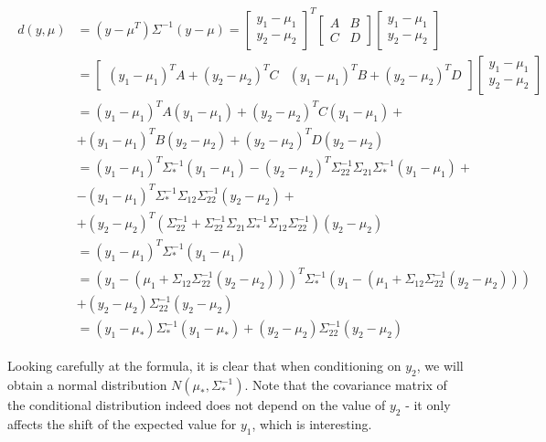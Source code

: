 \documentclass[fleqn]{article}
\numberwithin{equation}{section}
\numberwithin{theorem}{section}
\numberwithin{figure}{section}
\numberwithin{lemma}{section}
\numberwithin{corollary}{section}
\begin{document}
\begin{align}
	\begin{split}
		d(y, \mu) &= (y - \mu^T)\Sigma^{-1}(y-\mu) = \begin{bmatrix}
			y_1 - \mu_1  \\
			y_2 - \mu_2 
		\end{bmatrix}^T
		\begin{bmatrix}
			A & B \\
			C & D
		\end{bmatrix}
		\begin{bmatrix}
			y_1 - \mu_1  \\
			y_2 - \mu_2 
		\end{bmatrix} \\
		&= \begin{bmatrix}
			(y_1 - \mu_1)^TA + (y_2 - \mu_2)^TC & (y_1 - \mu_1)^TB + (y_2 - \mu_2)^TD 
		\end{bmatrix}
		\begin{bmatrix}
			y_1 - \mu_1  \\
			y_2 - \mu_2 
		\end{bmatrix} \\
		&= (y_1 - \mu_1)^TA(y_1 - \mu_1) + (y_2 - \mu_2)^TC(y_1 - \mu_1) +  \\
		&+ (y_1 - \mu_1)^TB(y_2 - \mu_2) + (y_2 - \mu_2)^TD(y_2 - \mu_2)\\
		&= (y_1 - \mu_1)^T\Sigma_*^{-1}(y_1 - \mu_1) -(y_2 - \mu_2)^T\Sigma_{22}^{-1}\Sigma_{21}\Sigma_*^{-1}(y_1 - \mu_1) +  \\
		&- (y_1 - \mu_1)^T\Sigma_*^{-1}\Sigma_{12}\Sigma_{22}^{-1}(y_2 - \mu_2) +\\
		&+ (y_2 - \mu_2)^T(\Sigma_{22}^{-1} + \Sigma_{22}^{-1} \Sigma_{21}\Sigma_*^{-1}\Sigma_{12}\Sigma_{22}^{-1})(y_2 - \mu_2)\\
		&= (y_1 - \mu_1)^T\Sigma_*^{-1}(y_1 - \mu_1)\\
		&= (y_1 - (\mu_1 + \Sigma_{12}\Sigma_{22}^{-1}(y_2 - \mu_2)))^T \Sigma_*^{-1} (y_1 - (\mu_1 + \Sigma_{12}\Sigma_{22}^{-1}(y_2 - \mu_2))) \\
		&+ (y_2 - \mu_2) \Sigma_{22}^{-1}(y_2 - \mu_2)\\
		&= (y_1 - \mu_*)\Sigma_*^{-1}(y_1 - \mu_*) +  (y_2 - \mu_2) \Sigma_{22}^{-1}(y_2 - \mu_2)
	\end{split}
\end{align}

Looking carefully at the formula, it is clear that when conditioning on $y_2$, we will obtain a normal distribution $N(\mu_*, \Sigma_*^{-1})$. Note that the covariance matrix of the conditional distribution indeed does not depend on the value of $y_2$ - it only affects the shift of the expected value for $y_1$, which is interesting.
\end{document}
